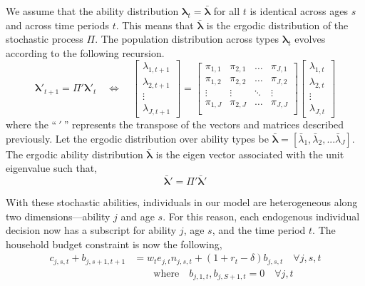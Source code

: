 \documentclass[letterpaper,12pt]{article}
\theoremstyle{definition}
\numberwithin{equation}{section}
\numberwithin{exercise}{section}
\begin{document}
\begin{spacing}{1.5}
      We assume that the ability distribution $\bm{\lambda}_t = \bm{\bar{\lambda}}$ for all $t$ is identical across ages $s$ and across time periods $t$. This means that $\bm{\bar{\lambda}}$ is the ergodic distribution of the stochastic process $\Pi$. The population distribution across types $\bm{\lambda}_t$ evolves according to the following recursion.
      \begin{equation}\label{EqLambdaRec}
         \bm{\lambda}'_{t+1} = \Pi' \bm{\lambda}'_t \quad\Leftrightarrow\quad
         \begin{bmatrix}\lambda_{1,t+1} \\ \lambda_{2,t+1} \\ \vdots \\ \lambda_{J,t+1} \end{bmatrix} =
         \begin{bmatrix}
            \pi_{1,1} & \pi_{2,1} & \hdots & \pi_{J,1} \\
            \pi_{1,2} & \pi_{2,2} & \hdots & \pi_{J,2} \\
            \vdots    & \vdots    & \ddots & \vdots    \\
            \pi_{1,J} & \pi_{2,J} & \hdots & \pi_{J,J} \\
         \end{bmatrix}
         \begin{bmatrix}\lambda_{1,t} \\ \lambda_{2,t} \\ \vdots \\ \lambda_{J,t} \end{bmatrix}
      \end{equation}
      where the ``$\:'\:$'' represents the transpose of the vectors and matrices described previously. Let the ergodic distribution over ability types be $\bm{\bar{\lambda}}=[\bar{\lambda}_1,\bar{\lambda}_2,...\bar{\lambda}_J]$. The ergodic ability distribution $\bm{\bar{\lambda}}$ is the eigen vector associated with the unit eigenvalue such that,
      \begin{equation}\label{EqLamgdaErg}
         \bm{\bar{\lambda}}' = \Pi' \bm{\bar{\lambda}}'
      \end{equation}

      With these stochastic abilities, individuals in our model are heterogeneous along two dimensions---ability $j$ and age $s$. For this reason, each endogenous individual decision now has a subscript for ability $j$, age $s$, and the time period $t$. The household budget constraint is now the following,
      \begin{equation}\label{EqSperStochHHbc}
         \begin{split}
            c_{j,s,t} + b_{j,s+1,t+1} &= w_t e_{j,t}n_{j,s,t} + (1 + r_{t} - \delta)b_{j,s,t} \quad\forall j,s,t \\
            &\qquad\text{where}\quad b_{j,1,t},b_{j,S+1,t} = 0 \quad\forall j,t
         \end{split}
      \end{equation}


\end{spacing}
\end{document}
